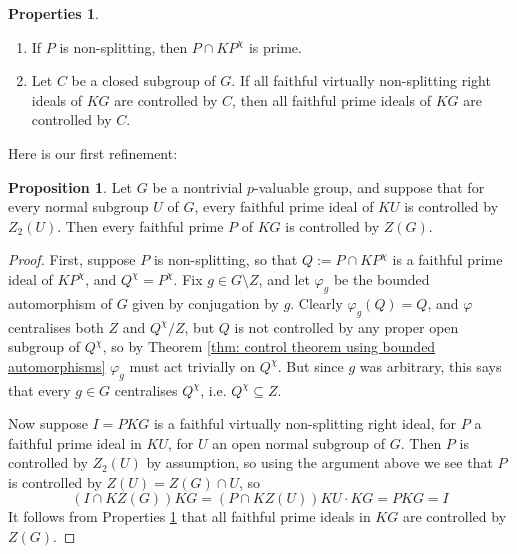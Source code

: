 \documentclass[12pt,a4paper]{article}
\theoremstyle{definition}
\newtheorem{propn}[thm]{Proposition}
\newtheorem{props}[thm]{Properties}
\theoremstyle{remark}
\theoremstyle{custthm}
\begin{document}
\begin{props}\label{props: non-splitting right ideals}
$ $

\begin{enumerate}[label=(\roman*)]
\item \cite[Proposition 4.3]{jones-control-theorem} If $P$ is non-splitting, then $P\cap KP^\chi$ is prime.
\item \cite[Theorem 3.17]{jones-primitive-ideals} Let $C$ be a closed subgroup of $G$. If all faithful virtually non-splitting right ideals of $KG$ are controlled by $C$, then all faithful prime ideals of $KG$ are controlled by $C$.
\end{enumerate}
\end{props}

Here is our first refinement:

\begin{propn}\label{propn: from Z2 to Z}
Let $G$ be a nontrivial $p$-valuable group, and suppose that for every normal subgroup $U$ of $G$, every faithful prime ideal of $KU$ is controlled by $Z_2(U)$. Then every faithful prime $P$ of $KG$ is controlled by $Z(G)$.
\end{propn}

\begin{proof}
First, suppose $P$ is non-splitting, so that $Q := P\cap KP^\chi$ is a faithful prime ideal of $KP^\chi$, and $Q^\chi = P^\chi$. Fix $g\in G \setminus Z$, and let $\varphi_g$ be the bounded automorphism of $G$ given by conjugation by $g$. Clearly $\varphi_g(Q) = Q$, and $\varphi$ centralises both $Z$ and $Q^\chi/Z$, but $Q$ is not controlled by any proper open subgroup of $Q^\chi$, so by Theorem \ref{thm: control theorem using bounded automorphisms} $\varphi_g$ must act trivially on $Q^\chi$. But since $g$ was arbitrary, this says that every $g\in G$ centralises $Q^\chi$, i.e. $Q^\chi \subseteq Z$.

Now suppose $I=PKG$ is a faithful virtually non-splitting right ideal, for $P$ a faithful prime ideal in $KU$, for $U$ an open normal subgroup of $G$. Then $P$ is controlled by $Z_2(U)$ by assumption, so using the argument above we see that $P$ is controlled by $Z(U)=Z(G)\cap U$, so $$(I\cap KZ(G))KG=(P\cap KZ(U))KU\cdot KG=PKG=I$$ It follows from Properties \ref{props: non-splitting right ideals} that all faithful prime ideals in $KG$ are controlled by $Z(G)$.\end{proof}

\end{document}
